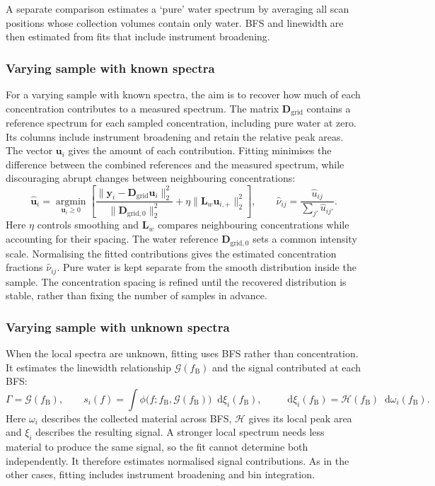 \documentclass[11pt]{article}
\newcommand{\dd}{\mathop{}\!\mathrm{d}}
\begin{document}
A separate comparison estimates a \lq{}pure\rq{} water spectrum by averaging all scan positions whose collection volumes contain only water. BFS and linewidth are then estimated from fits that include instrument broadening.

\subsubsection{Varying sample with known spectra}

For a varying sample with known spectra, the aim is to recover how much of each concentration contributes to a measured spectrum. The matrix $\mathbf D_{\mathrm{grid}}$ contains a reference spectrum for each sampled concentration, including pure water at zero. Its columns include instrument broadening and retain the relative peak areas. The vector $\mathbf u_i$ gives the amount of each contribution. Fitting minimises the difference between the combined references and the measured spectrum, while discouraging abrupt changes between neighbouring concentrations:
\begin{equation}
 \widehat{\mathbf u}_i=\underset{\mathbf u_i\geq0}{\operatorname{argmin}}
 \left[\frac{\|\mathbf y_i-\mathbf D_{\mathrm{grid}}\mathbf u_i\|_2^2}
 {\|\mathbf D_{\mathrm{grid},0}\|_2^2}
 +\eta\|\mathbf L_w\mathbf u_{i,+}\|_2^2\right],\qquad
 \widehat\nu_{ij}=\frac{\widehat u_{ij}}{\sum_{j'}\widehat u_{ij'}}.
 \label{eq:regularised_distribution}
\end{equation}
Here $\eta$ controls smoothing and $\mathbf L_w$ compares neighbouring concentrations while accounting for their spacing. The water reference $\mathbf D_{\mathrm{grid},0}$ sets a common intensity scale. Normalising the fitted contributions gives the estimated concentration fractions $\widehat\nu_{ij}$. Pure water is kept separate from the smooth distribution inside the sample. The concentration spacing is refined until the recovered distribution is stable, rather than fixing the number of samples in advance.

\subsubsection{Varying sample with unknown spectra}

When the local spectra are unknown, fitting uses BFS rather than concentration. It estimates the linewidth relationship $\mathcal G(f_{\mathrm B})$ and the signal contributed at each BFS:
\begin{equation}
 \Gamma=\mathcal G(f_{\mathrm B}),\qquad
 s_i(f)=\int\phi\bigl(f;f_{\mathrm B},\mathcal G(f_{\mathrm B})\bigr)\dd\xi_i(f_{\mathrm B}),\qquad
 \dd\xi_i(f_{\mathrm B})=\mathcal H(f_{\mathrm B})\dd\omega_i(f_{\mathrm B}).
 \label{eq:unknown_family}
\end{equation}
Here $\omega_i$ describes the collected material across BFS, $\mathcal H$ gives its local peak area and $\xi_i$ describes the resulting signal. A stronger local spectrum needs less material to produce the same signal, so the fit cannot determine both independently. It therefore estimates normalised signal contributions. As in the other cases, fitting includes instrument broadening and bin integration.
\end{document}
